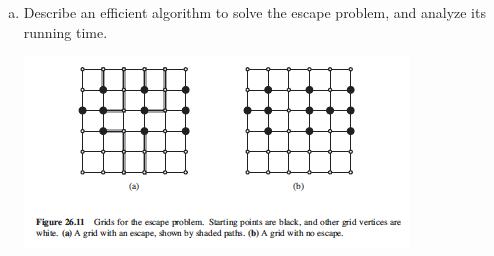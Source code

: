 \documentclass[12pt]{article}
\begin{document}
\begin{enumerate}[1.]
\begin{enumerate}[a)]
        \item Describe an efficient algorithm to solve the escape problem, and analyze its
        running time.

        \begin{center}
        \includegraphics[width=\linewidth]{images/worksheet_5_1.png}
        \end{center}
    \end{enumerate}
\end{enumerate}
\end{document}
